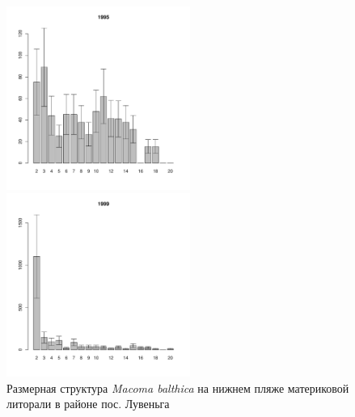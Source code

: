 \begin{figure}[hp]
	\begin{minipage}[b]{.3\linewidth}
	\begin{center}
	\includegraphics[width=60mm]{../White_Sea/Luvenga_II_razrez/low_beatch2_1995_.pdf}
	\end{center}
	\end{minipage}
	\hfill
	\begin{minipage}[b]{.3\linewidth}
	\begin{center}
	\includegraphics[width=60mm]{../White_Sea/Luvenga_II_razrez/low_beatch2_1999_.pdf}
	\end{center}
	\end{minipage}
	\hfill
	\begin{minipage}[b]{.3\linewidth}
	\begin{center}

	\end{center}
	\end{minipage}
\caption{Размерная структура {\it Macoma balthica} на нижнем пляже материковой литорали в районе пос. Лувеньга}
\label{ris:size_str_2razrez_low}
\end{figure}

